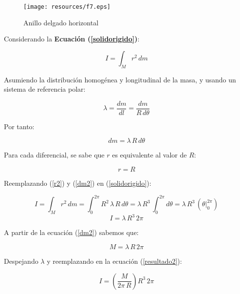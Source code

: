 \documentclass[letter,twoside,11pt]{article}
\begin{document}
\begin{figure}
\centering
\texttt{[image: resources/f7.eps]}
\caption{Anillo delgado horizontal}
\label{figura7}
\end{figure}

Considerando la \textbf{Ecuación (\ref{solidorigido})}:

\begin{equation*}
    I = \int_{M} r^2\, dm
\tag{4}
\end{equation*}

Asumiendo la distribución homogénea y longitudinal de la masa, y usando un
sistema de referencia polar:

\begin{equation*}
    \lambda = \frac{dm}{dl} = \frac{dm}{R\, d\theta}
\end{equation*}

Por tanto:

\begin{equation}
    dm = \lambda\, R\, d\theta
\label{dm2}
\end{equation}

Para cada diferencial, se sabe que $r$ es equivalente al valor de
$R$:

\begin{equation}
    r = R
\label{r2}
\end{equation}

Reemplazando (\ref{r2}) y (\ref{dm2}) en (\ref{solidorigido}):

\begin{equation*}
    I = \int_{M} r^2\, dm = \int_{0}^{2\pi} R^2\, \lambda\, R\, d\theta = \lambda\, R^3\, \int_{0}^{2\pi} d\theta = \lambda\, R^3\, (\theta \Biggr|_{0}^{2\pi})
\end{equation*}
\begin{equation}
    I = \lambda\, R^3\, 2\pi
\label{resultado2}
\end{equation}

A partir de la ecuación (\ref{dm2}) sabemos que:

\begin{equation*}
    M = \lambda\, R\, 2\pi
\end{equation*}

Despejando $\lambda$ y reemplazando en la ecuación (\ref{resultado2}):

\begin{equation*}
    I = \left( \frac{M}{2\pi\, R} \right) R^3\, 2\pi
\end{equation*}
\end{document}
